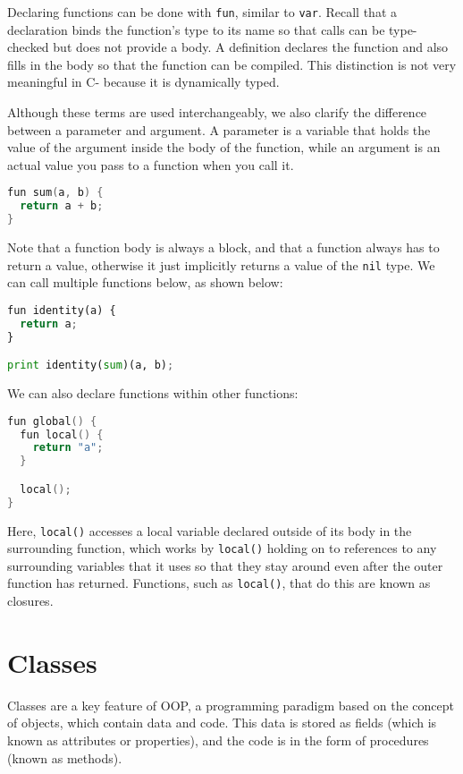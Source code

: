 Declaring functions can be done with \verb+fun+, similar to \verb+var+. Recall that a declaration binds the function’s type to its name so that calls can be type-checked but does not provide a body. A definition declares the function and also fills in the body so that the function can be compiled. This distinction is not very meaningful in C- because it is dynamically typed. 

Although these terms are used interchangeably, we also clarify the difference between a parameter and argument. A parameter is a variable that holds the value of the argument inside the body of the function, while an argument is an actual value you pass to a function when you call it.

\begin{lstlisting}[language=C]
fun sum(a, b) {
  return a + b;
}
\end{lstlisting}

Note that a function body is always a block, and that a function always has to return a value, otherwise it just implicitly returns a value of the \verb+nil+ type. We can call multiple functions below, as shown below:

\begin{lstlisting}[language=python]
fun identity(a) {
  return a;
}

print identity(sum)(a, b);
\end{lstlisting}

We can also declare functions within other functions:


\begin{lstlisting}[language=C]
fun global() {
  fun local() {
    return "a";
  }

  local();
}
\end{lstlisting}

Here, \verb+local()+ accesses a local variable declared outside of its body in the surrounding function, which works by \verb+local()+ holding on to references to any surrounding variables that it uses so that they stay around even after the outer function has returned. Functions, such as \verb+local()+, that do this are known as closures.

\section{Classes}

Classes are a key feature of \ac{OOP}, a programming paradigm based on the concept of objects, which contain data and code. This data is stored as fields (which is known as attributes or properties), and the code is in the form of procedures (known as methods). 

